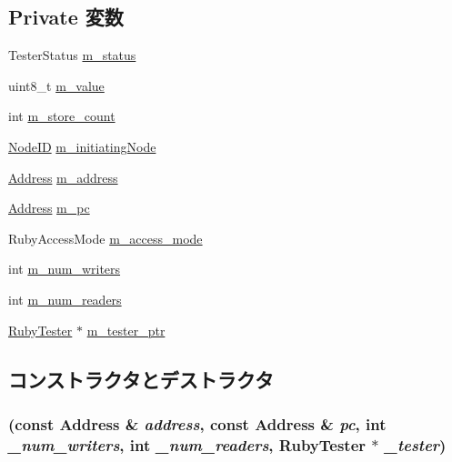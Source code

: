 \subsection*{Private 変数}
\begin{DoxyCompactItemize}
\item 
TesterStatus \hyperlink{classCheck_a70259b2e0a9ded04ee46b786d423b50c}{m\_\-status}
\item 
uint8\_\-t \hyperlink{classCheck_a5307fc878e97122f4a7fc315f2329c08}{m\_\-value}
\item 
int \hyperlink{classCheck_ad10763fc3ed0f7ccb24a268ad25ccc7d}{m\_\-store\_\-count}
\item 
\hyperlink{TypeDefines_8hh_a83c14b4ae37e80071f6b3506a6c46151}{NodeID} \hyperlink{classCheck_a126a08ce5cd6fa00a0327f01957bd420}{m\_\-initiatingNode}
\item 
\hyperlink{classAddress}{Address} \hyperlink{classCheck_a9fc76d7db60d4f05200f8248a697ea28}{m\_\-address}
\item 
\hyperlink{classAddress}{Address} \hyperlink{classCheck_a054fda5975595c15c2cb078c5bc10888}{m\_\-pc}
\item 
RubyAccessMode \hyperlink{classCheck_a519d9b4ec6b00fb1f4cfc481ee37121e}{m\_\-access\_\-mode}
\item 
int \hyperlink{classCheck_aedeaccd67403213e1e43d99ff1c70f44}{m\_\-num\_\-writers}
\item 
int \hyperlink{classCheck_a7d224a04c5f0d1049dd6c6ab070884cb}{m\_\-num\_\-readers}
\item 
\hyperlink{classRubyTester}{RubyTester} $\ast$ \hyperlink{classCheck_aaff3af064462a4d4b7f986a4a2454ff0}{m\_\-tester\_\-ptr}
\end{DoxyCompactItemize}


\subsection{コンストラクタとデストラクタ}
\hypertarget{classCheck_ac91bf1af0228e3ff24854600a2791d50}{
\subsubsection[{Check}]{ (const {\bf Address} \& {\em address}, \/  const {\bf Address} \& {\em pc}, \/  int {\em \_\-num\_\-writers}, \/  int {\em \_\-num\_\-readers}, \/  {\bf RubyTester} $\ast$ {\em \_\-tester})}}
\label{classCheck_ac91bf1af0228e3ff24854600a2791d50}



